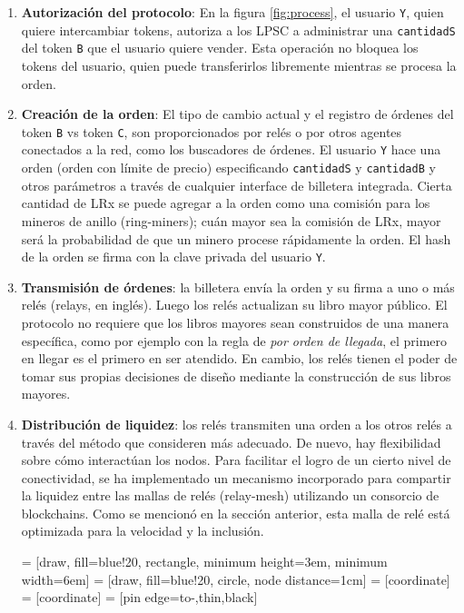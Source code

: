 \documentclass[UTF8,nofonts]{article}
\makeatletter
\newenvironment{figurehere}
 {\def\@captype{figure}}
 {}
\makeatother
\begin{document}
\begin{multicols}{2}
\begin{enumerate}
\item \textbf{Autorizaci\'on del protocolo}: En la figura \ref{fig:process}, el usuario \verb|Y|, quien quiere intercambiar tokens, autoriza a los LPSC a administrar una \verb|cantidadS| del token \verb|B| que el usuario quiere vender. Esta operaci\'on no bloquea los tokens del usuario, quien puede transferirlos libremente mientras se procesa la orden.

\item \textbf{Creaci\'on de la orden}: El tipo de cambio actual y el registro de \'ordenes del token \verb|B| vs token \verb|C|, son proporcionados por rel\'es o por otros agentes conectados a la red, como los buscadores de \'ordenes. El usuario \verb|Y| hace una orden (orden con l\'imite de precio) especificando  \verb|cantidadS| y \verb|cantidadB| y otros par\'ametros a trav\'es de cualquier interface de billetera integrada. Cierta cantidad de LRx se puede agregar a la orden como una comisi\'on para los mineros de anillo (ring-miners); cu\'an mayor sea la comisi\'on de LRx, mayor ser\'a la probabilidad de que un minero procese r\'apidamente la orden. El hash de la orden se firma con la clave privada del usuario \verb|Y|.

\item \textbf{Transmisi\'on de \'ordenes}: la billetera env\'ia la orden y su firma a uno o m\'as rel\'es (relays, en ingl\'es). Luego los rel\'es actualizan su libro mayor p\'ublico. El protocolo no requiere que los libros mayores sean construidos de una manera espec\'ifica, como por ejemplo con la regla de  \textit{por orden de llegada}, el primero en llegar es el primero en ser atendido. En cambio, los rel\'es tienen el poder de tomar sus propias decisiones de dise\~no mediante la construcci\'on de sus libros mayores.

\item \textbf{Distribuci\'on de liquidez}: los rel\'es transmiten una orden a los otros rel\'es a trav\'es del m\'etodo que consideren m\'as adecuado. De nuevo, hay flexibilidad sobre c\'omo interact\'uan los nodos. Para facilitar el logro de un cierto nivel de conectividad, se ha implementado un mecanismo incorporado para compartir la liquidez entre las mallas de rel\'es (relay-mesh) utilizando un consorcio de blockchains. Como se mencion\'o en la secci\'on anterior, esta malla de rel\'e est\'a optimizada para la velocidad y la inclusi\'on.

\begin{center}
\begin{figurehere}
\centering
{} = [draw, fill=blue!20, rectangle, 
    minimum height=3em, minimum width=6em]
 = [draw, fill=blue!20, circle, node distance=1cm]
 = [coordinate]
 = [coordinate]
 = [pin edge={to-,thin,black}]


\end{figurehere}
\end{center}
\end{enumerate}
\end{multicols}
\end{document}

